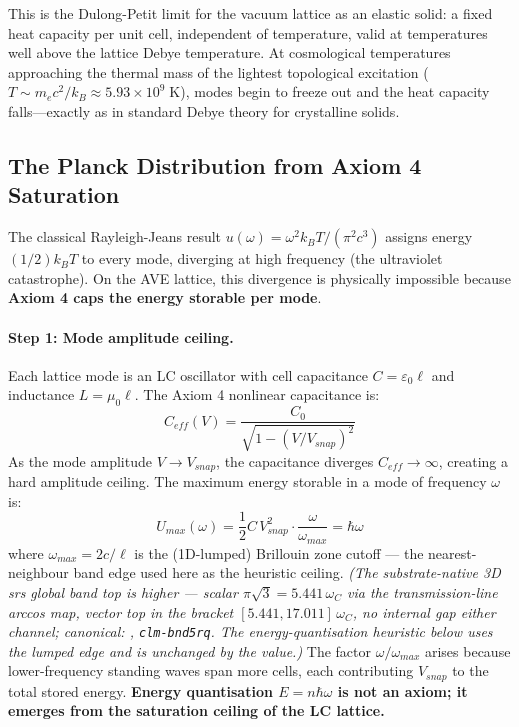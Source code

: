 This is the Dulong-Petit limit for the vacuum lattice as an elastic solid: a fixed heat capacity per unit cell, independent of temperature, valid at temperatures well above the lattice Debye temperature. At cosmological temperatures approaching the thermal mass of the lightest topological excitation ($T \sim m_e c^2 / k_B \approx 5.93 \times 10^9 \;\text{K}$), modes begin to freeze out and the heat capacity falls---exactly as in standard Debye theory for crystalline solids.

\subsection{The Planck Distribution from Axiom 4 Saturation}
\label{sec:planck_distribution}

The classical Rayleigh-Jeans result $u(\omega) = \omega^2 k_B T / (\pi^2 c^3)$ assigns energy $(1/2) k_B T$ to every mode, diverging at high frequency (the ultraviolet catastrophe). On the AVE lattice, this divergence is physically impossible because \textbf{Axiom 4 caps the energy storable per mode}.

\paragraph{Step 1: Mode amplitude ceiling.}
Each lattice mode is an LC oscillator with cell capacitance $C = \varepsilon_0 \ell$ and inductance $L = \mu_0 \ell$. The Axiom 4 nonlinear capacitance is:
\begin{equation}
    C_{eff}(V) = \frac{C_0}{\sqrt{1 - (V/V_{snap})^2}}
\end{equation}
As the mode amplitude $V \to V_{snap}$, the capacitance diverges $C_{eff} \to \infty$, creating a hard amplitude ceiling. The maximum energy storable in a mode of frequency $\omega$ is:
\begin{equation}
    U_{max}(\omega) = \frac{1}{2} C \, V_{snap}^2 \cdot \frac{\omega}{\omega_{max}} = \hbar\omega
    \label{eq:mode_quantization}
\end{equation}
where $\omega_{max} = 2c/\ell$ is the (1D-lumped) Brillouin zone cutoff --- the nearest-neighbour band edge used here as the heuristic ceiling. \emph{(The substrate-native 3D srs global band top is higher --- scalar $\pi\sqrt3 = 5.441\,\omega_C$ via the transmission-line arccos map, vector top in the bracket $[5.441, 17.011]\,\omega_C$, no internal gap either channel; canonical: , \texttt{clm-bnd5rq}. The energy-quantisation heuristic below uses the lumped edge and is unchanged by the value.)} The factor $\omega/\omega_{max}$ arises because lower-frequency standing waves span more cells, each contributing $V_{snap}$ to the total stored energy. \textbf{Energy quantisation $E = n\hbar\omega$ is not an axiom; it emerges from the saturation ceiling of the LC lattice.}

